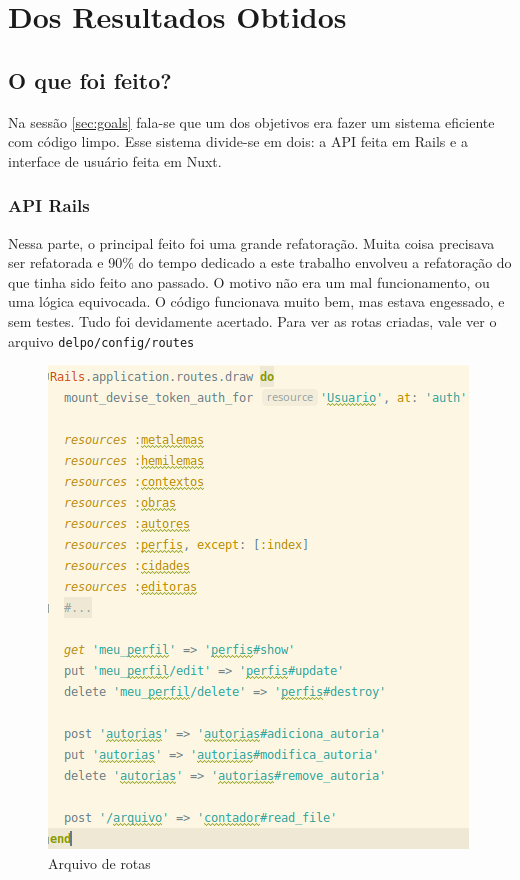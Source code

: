
\chapter{Dos Resultados Obtidos}
\label{cap:results}
\minitoc


\section{O que foi feito?}
\label{sec:to-be-done}

Na sessão \ref{sec:goals} fala-se que um dos objetivos era fazer um sistema eficiente com código limpo. Esse sistema
divide-se em dois: a API feita em Rails e a interface de usuário feita em Nuxt.

\subsection{API Rails}\label{subsec:api-rails}

Nessa parte, o principal feito foi uma grande refatoração. Muita coisa precisava ser refatorada e 90\% do tempo dedicado
a este trabalho envolveu a refatoração do que tinha sido feito ano passado. O motivo não era um mal funcionamento, ou
uma lógica equivocada. O código funcionava muito bem, mas estava engessado, e sem testes. Tudo foi devidamente acertado.
Para ver as rotas criadas, vale ver o arquivo \texttt{delpo/config/routes}

\begin{figure}[h]
    \centering
    \includegraphics[width=.6\textwidth]{figuras/rails_routes.png}
    \caption{Arquivo de rotas}
    \label{fig:routes_files}
\end{figure}

